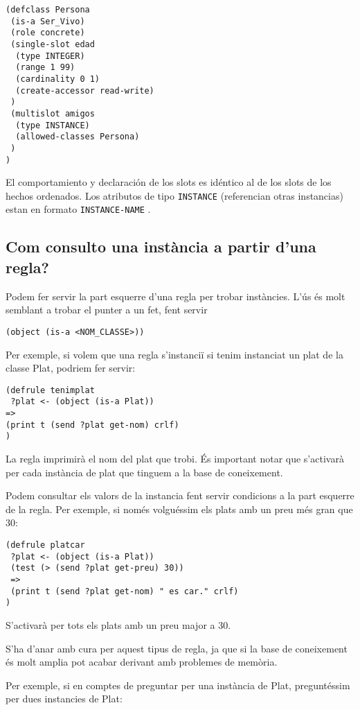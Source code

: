 \documentclass[11pt,svgnames]{scrbook}
\begin{document}
\begin{verbatim}
(defclass Persona
 (is-a Ser_Vivo)
 (role concrete)
 (single-slot edad
  (type INTEGER)
  (range 1 99)
  (cardinality 0 1)
  (create-accessor read-write)
 )
 (multislot amigos
  (type INSTANCE)
  (allowed-classes Persona)
 )
)
\end{verbatim} 

El comportamiento y declaración de los slots es idéntico al de los slots de los
hechos ordenados. Los atributos de tipo \texttt{INSTANCE} (referencian otras
instancias)
estan en formato \texttt{INSTANCE-NAME} .

\subsection{Com consulto una instància a partir d'una regla?}


Podem fer servir la part esquerre d'una regla per trobar instàncies. L'ús és
molt semblant a trobar el punter a un fet, fent servir
\medskip

\texttt{(object (is-a <NOM\_CLASSE>))}
\medskip

Per exemple, si volem que una regla s'instanciï si tenim instanciat un plat de
la classe Plat, podriem fer servir:

\begin{verbatim}
(defrule tenimplat
 ?plat <- (object (is-a Plat))
=>
(print t (send ?plat get-nom) crlf)
)\end{verbatim} 

La regla imprimirà el nom del plat que trobi. És important notar que s'activarà
per cada instància de plat que tinguem a la base de coneixement.

Podem consultar els valors de la instancia fent servir condicions a la part
esquerre de la regla. Per exemple, si només volguéssim els plats amb un preu més
gran que 30:

\begin{verbatim}
(defrule platcar
 ?plat <- (object (is-a Plat))
 (test (> (send ?plat get-preu) 30))
 =>
 (print t (send ?plat get-nom) " es car." crlf)
) \end{verbatim} 

S'activarà per tots els plats amb un preu major a 30.

S'ha d'anar amb cura per aquest tipus de regla, ja que si la base de coneixement
és molt amplia pot acabar derivant amb problemes de memòria.

Per exemple, si en comptes de preguntar per una instància de Plat, preguntéssim
per dues instancies de Plat:
\end{document}
